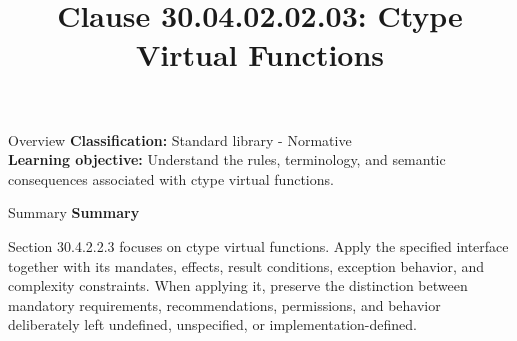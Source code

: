 \documentclass[10pt,letterpaper]{article}
\title{Clause 30.04.02.02.03: Ctype Virtual Functions}
\author{}
\date{}
\begin{document}
\maketitle
\begin{CornellOverviewBox}{Overview}
\textbf{Classification:} Standard library - Normative\\[2pt]
\textbf{Learning objective:} Understand the rules, terminology, and semantic consequences associated with ctype virtual functions.
\end{CornellOverviewBox}\begin{CornellSummaryBox}{Summary}
{\sffamily\bfseries\color{Accent} Summary}\par\vspace{3pt}Section 30.4.2.2.3 focuses on ctype virtual functions. Apply the specified interface together with its mandates, effects, result conditions, exception behavior, and complexity constraints. When applying it, preserve the distinction between mandatory requirements, recommendations, permissions, and behavior deliberately left undefined, unspecified, or implementation-defined.
\end{CornellSummaryBox}
\end{document}
